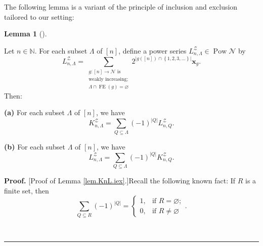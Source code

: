 \documentclass[numbers=enddot,12pt,final,onecolumn,notitlepage]{scrartcl}%
\theoremstyle{definition}
\newtheorem{lem}[theo]{Lemma}
\newenvironment{lemma}[1][]
{\begin{lem}[#1]\begin{leftbar}}
{\end{leftbar}\end{lem}}
\newenvironment{proof}[1][Proof]{\noindent\textbf{#1.} }{\ \rule{0.5em}{0.5em}}
\newenvironment{verlong}{}{}
\let\sumnonlimits\sum
\renewcommand{\sum}{\sumnonlimits\limits}
\begin{document}
\begin{verlong}
The following lemma is a variant of the principle of inclusion and exclusion
tailored to our setting:

\begin{lemma}
\label{lem.KnL.iex}Let $n\in\mathbb{N}$. For each subset $\Lambda$ of $\left[
n\right]  $, define a power series $L_{n,\Lambda}^{\mathcal{Z}}\in
\operatorname*{Pow}\mathcal{N}$ by%
\begin{equation}
L_{n,\Lambda}^{\mathcal{Z}}=\sum_{\substack{g:\left[  n\right]  \rightarrow
\mathcal{N}\text{ is}\\\text{weakly increasing;}\\\Lambda\cap
\operatorname*{FE}\left(  g\right)  =\varnothing}}2^{\left\vert g\left(
\left[  n\right]  \right)  \cap\left\{  1,2,3,\ldots\right\}  \right\vert
}\mathbf{x}_{g}. \label{eq.lem.KnL.iex.defL}%
\end{equation}
Then:

\textbf{(a)} For each subset $\Lambda$ of $\left[  n\right]  $, we have%
\[
K_{n,\Lambda}^{\mathcal{Z}}=\sum_{Q\subseteq\Lambda}\left(  -1\right)
^{\left\vert Q\right\vert }L_{n,Q}^{\mathcal{Z}}.
\]


\textbf{(b)} For each subset $\Lambda$ of $\left[  n\right]  $, we have%
\[
L_{n,\Lambda}^{\mathcal{Z}}=\sum_{Q\subseteq\Lambda}\left(  -1\right)
^{\left\vert Q\right\vert }K_{n,Q}^{\mathcal{Z}}.
\]

\end{lemma}

\begin{proof}
[Proof of Lemma \ref{lem.KnL.iex}.]Recall the following known fact: If $R$ is
a finite set, then%
\begin{equation}
\sum_{Q\subseteq R}\left(  -1\right)  ^{\left\vert Q\right\vert }=%
\begin{cases}
1, & \text{if }R=\varnothing;\\
0, & \text{if }R\neq\varnothing
\end{cases}
. \label{pf.lem.KnL.iex.1}%
\end{equation}


\end{proof}
\end{verlong}
\end{document}
